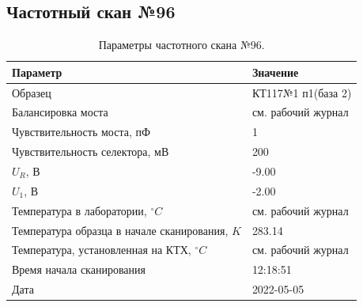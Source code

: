 \subsection{Частотный скан №96}
\begin{table}[!ht]
    \centering
    \caption{Параметры частотного скана №96.}
    \begin{tabular}{|l|l|}
        \hline
        Параметр                                       & Значение                  \\ \hline
        Образец                                        & КТ117№1 п1(база 2)        \\ \hline
        Балансировка моста                             & см. рабочий журнал        \\ \hline
        Чувствительность моста, пФ                     & 1                         \\ \hline
        Чувствительность селектора, мВ                 & 200                       \\ \hline
        $U_R$, В                                       & -9.00                     \\ \hline
        $U_1$, В                                       & -2.00                     \\ \hline
        Температура в лаборатории, $^\circ C$          & см. рабочий журнал        \\ \hline
        Температура образца в начале сканирования, $K$ & 283.14                    \\ \hline
        Температура, установленная на КТХ, $^\circ C$  & см. рабочий журнал        \\ \hline
        Время начала сканирования                      & 12:18:51                  \\ \hline
        Дата                                           & 2022-05-05                \\ \hline
    \end{tabular}
    \label{table:frequency_scan_96}
\end{table}

